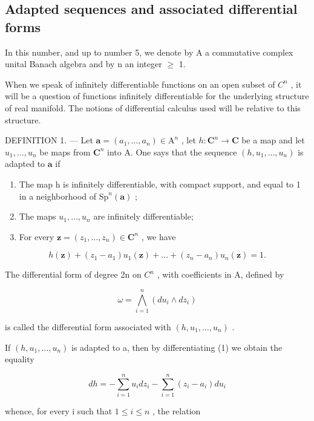 \subsection{Adapted sequences and associated differential forms}

In this number, and up to number 5, we denote by A a commutative complex unital Banach algebra and by n an integer \(\geqslant\) 1.

When we speak of infinitely differentiable functions on an open subset of \(C^{n}\) , it will be a question of functions infinitely differentiable for the underlying structure of real manifold. The notions of differential calculus used will be relative to this structure.

DEFINITION 1. --- Let \(\boldsymbol{a} = (a_{1},\ldots ,a_{n})\in \mathrm{A}^{n}\) , let \(h\colon \mathbf{C}^n\to \mathbf{C}\) be a map and let \(u_{1},\ldots ,u_{n}\) be maps from \(\mathbf{C}^n\) into A. One says that the sequence \((h,u_1,\dots ,u_n)\) is adapted to \(\boldsymbol{a}\) if

\begin{enumerate}
\def\labelenumi{(\roman{enumi})}
\item
  The map h is infinitely differentiable, with compact support, and equal to 1 in a neighborhood of \(\mathrm{Sp}^n (\boldsymbol {a})\) ;
\item
  The maps \(u_1, \ldots, u_n\) are infinitely differentiable;
\item
  For every \(\boldsymbol{z} = (z_{1},\dots ,z_{n})\in \mathbf{C}^{n}\) , we have
\end{enumerate}

\[
h (\boldsymbol {z}) + (z _ {1} - a _ {1}) u _ {1} (\boldsymbol {z}) + \dots + (z _ {n} - a _ {n}) u _ {n} (\boldsymbol {z}) = 1.\tag{1}
\]

The differential form of degree 2n on \(C^{n}\) , with coefficients in A, defined by

\[
\omega = \bigwedge_ {i = 1} ^ {n} (d u _ {i} \wedge d z _ {i})
\]

is called the differential form associated with \((h, u_1, \ldots, u_n)\) .

If \((h, u_{1}, \ldots, u_{n})\) is adapted to a, then by differentiating (1) we obtain the equality

\[
d h = - \sum_ {i = 1} ^ {n} u _ {i} d z _ {i} - \sum_ {i = 1} ^ {n} (z _ {i} - a _ {i}) d u _ {i}\tag{2}
\]

whence, for every i such that \(1 \leqslant i \leqslant n\) , the relation

